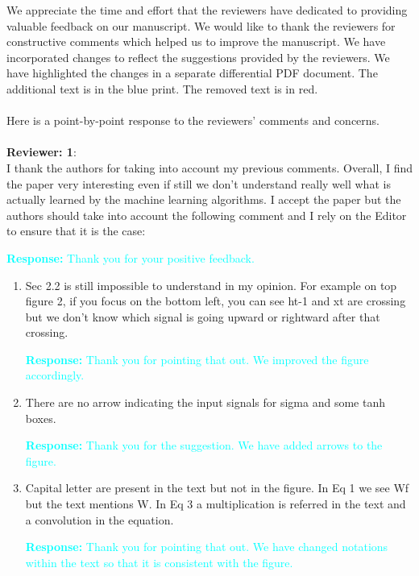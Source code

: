\documentclass[11pt,a2paper]{report}
\begin{document}
	
	\noindent We appreciate the time and effort that the reviewers have dedicated to providing valuable feedback on our manuscript. 
	We would like to thank the reviewers for constructive comments which helped us to improve the manuscript. 
	We have incorporated changes to reflect the suggestions provided by the reviewers. 
	We have highlighted the changes in a separate differential PDF document. The additional text is in the blue print. 
	The removed text is in red. \\ \\
	Here is a point-by-point response to the reviewers’ comments and concerns.
	\\ \\
	\textbf{Reviewer: 1}: \\
	I thank the authors for taking into account my previous comments. 
	Overall, I find the paper very interesting even if still we don't understand really well what is actually learned by the machine learning algorithms. 
	I accept the paper but the authors should take into account the following comment and I rely on the Editor to ensure that it is the case:
	
	\textcolor{Cyan}{
		\textbf{Response:}
	Thank you for your positive feedback.
    }
	\begin{enumerate}
		\item Sec 2.2 is still impossible to understand in my opinion. 
		For example on top figure 2, if you focus on the bottom left, you can see ht-1 and xt are crossing but we don't know which signal is going upward or rightward after that crossing.
		
		\textcolor{Cyan}{
			\textbf{Response:}
		Thank you for pointing that out. We improved the figure accordingly.
		}
		
		\item There are no arrow indicating the input signals for sigma and some tanh boxes.
		
		\textcolor{Cyan}{
			\textbf{Response:}
			Thank you for the suggestion. We have added arrows to the figure.
		}
		\item Capital letter are present in the text but not in the figure. 
		In Eq 1 we see Wf but the text mentions W. 
		In Eq 3 a multiplication is referred in the text and a convolution in the equation.
		
		\textcolor{Cyan}{
			\textbf{Response:}
			Thank you for pointing that out. We have changed notations within the text so that it is consistent with the figure.
		}		
	\end{enumerate}	
	
\end{document}
